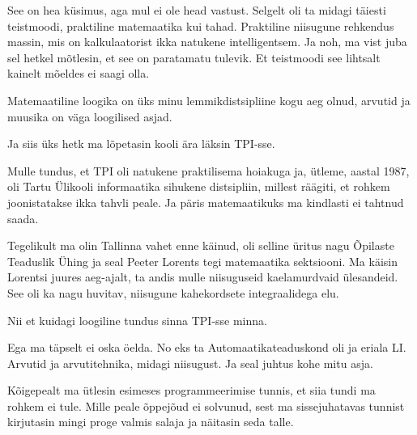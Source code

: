 
See on hea küsimus, aga mul ei ole head vastust. Selgelt oli ta midagi täiesti 
teistmoodi, praktiline matemaatika kui tahad. Praktiline niisugune rehkendus 
massin, mis on  kalkulaatorist ikka  natukene intelligentsem. Ja noh, ma vist 
juba sel hetkel mõtlesin, et see on paratamatu tulevik. Et teistmoodi see  
lihtsalt kainelt mõeldes ei saagi olla. 


Matemaatiline loogika on üks  minu lemmikdistsipliine kogu aeg olnud, arvutid  
ja muusika  on väga loogilised asjad. 

Ja siis üks hetk ma lõpetasin kooli ära läksin TPI-sse.


Mulle tundus, et TPI oli natukene praktilisema hoiakuga ja, ütleme, aastal 
1987, oli Tartu Ülikooli informaatika  sihukene distsipliin, millest räägiti, 
et rohkem joonistatakse ikka tahvli peale. Ja päris matemaatikuks ma kindlasti 
ei tahtnud saada.

Tegelikult ma olin Tallinna vahet enne käinud, oli selline üritus nagu Õpilaste 
Teaduslik Ühing ja seal  Peeter 
Lorents tegi matemaatika sektsiooni. Ma käisin 
Lorentsi juures aeg-ajalt,  ta andis mulle niisuguseid kaelamurdvaid 
ülesandeid. See oli ka nagu huvitav,  niisugune kahekordsete integraalidega 
elu. 

Nii et kuidagi loogiline tundus sinna TPI-sse minna.


Ega ma täpselt ei oska öelda. No eks ta  Automaatikateaduskond oli ja eriala 
LI. Arvutid ja 
arvutitehnika, midagi niisugust. Ja seal juhtus kohe  mitu asja. 

Kõigepealt ma ütlesin esimeses programmeerimise tunnis, et siia tundi ma rohkem 
ei tule. Mille peale õppejõud ei solvunud, sest ma sissejuhatavas tunnist 
kirjutasin mingi proge valmis salaja ja näitasin seda talle.

